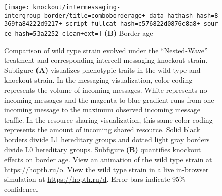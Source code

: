 \begin{figure}[!htbp]
\begin{center}
\begin{minipage}[t]{0.5\linewidth}
\hspace*{\fill}%
\begin{minipage}[t]{0.8\linewidth}
\centering
\vspace{0pt} %
\begin{minipage}[b]{\textwidth}
\texttt{[image: knockout/intermessaging-intergroup\_border/title=comboborderage+\_data\_hathash\_hash=8369fa84222d9217+\_script\_fullcat\_hash=c576822d0876c8a8+\_source\_hash=53a2252-clean+ext=]}
{\textbf{(B)} Border age}
\end{minipage}
\end{minipage}%
\hspace*{\fill}

\vspace{1ex}


\end{minipage}

\caption{
Comparison of wild type strain evolved under the ``Nested-Wave'' treatment and corresponding intercell messaging knockout strain.
Subfigure \textbf{(A)} visualizes phenotypic traits in the wild type and knockout strain.
In the messaging visualization, color coding represents the volume of incoming messages.
White represents no incoming messages and the magenta to blue gradient runs from one incoming message to the maximum observed incoming message traffic.
In the resource sharing visualization, this same color coding represents the amount of incoming shared resource.
Solid black borders divide L1 hereditary groups and dotted light gray borders divide L0 hereditary groups.
Subfigure \textbf{(B)} quantifies knockout effects on border age.
View an animation of the wild type strain at \url{https://hopth.ru/o}.
View the wild type strain in a live in-browser simulation at \url{https://hopth.ru/d}.
Error bars indicate 95\% confidence.
}
\label{fig:ko-intermessaging-intergroup_border}


\end{center}
\end{figure}
